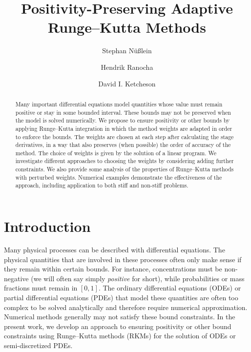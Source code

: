 \documentclass[a4paper]{article}
\title{Positivity-Preserving Adaptive Runge--Kutta Methods}
\author{Stephan Nüßlein \and Hendrik Ranocha \and David I. Ketcheson}
\numberwithin{equation}{section}
\theoremstyle{plain}
\theoremstyle{definition}
\numberwithin{theorem}{section}
\newcommand{\1}{\mathbbm{1}}
\begin{document}
\maketitle

\begin{abstract}
Many important differential equations model quantities whose value
must remain positive or stay in some bounded interval.
These bounds may not be preserved when the model is solved numerically.
We propose to ensure positivity or other bounds by applying Runge--Kutta
integration in which the method weights are adapted in order to
enforce the bounds.  The weights are chosen at each step after calculating the
stage derivatives, in a way that also preserves (when possible) the order of
accuracy of the method.  The choice of weights is given by the solution
of a linear program.
We investigate different approaches to choosing the weights by considering
adding further constraints.
We also provide some analysis of the properties
of Runge--Kutta methods with perturbed weights.  Numerical examples demonstrate
the effectiveness of the approach, including application to both stiff and
non-stiff problems.
\end{abstract}



\section{Introduction}


Many physical processes can be described with differential equations.
The physical quantities that are involved in these processes often only make sense if they remain within certain bounds.
For instance, concentrations must be non-negative (we will often say simply {\em positive} for short), while
probabilities or mass fractions must remain in $[0,1]$.
The ordinary differential equations (ODEs) or partial differential equations
(PDEs) that model these quantities are often too complex to be solved
analytically and therefore require numerical approximation.
Numerical methods generally may not satisfy these bound constraints.
In the present work, we develop an approach to ensuring positivity
or other bound constraints using Runge--Kutta methods (RKMs) for the
solution of ODEs or semi-discretized PDEs.
\end{document}
